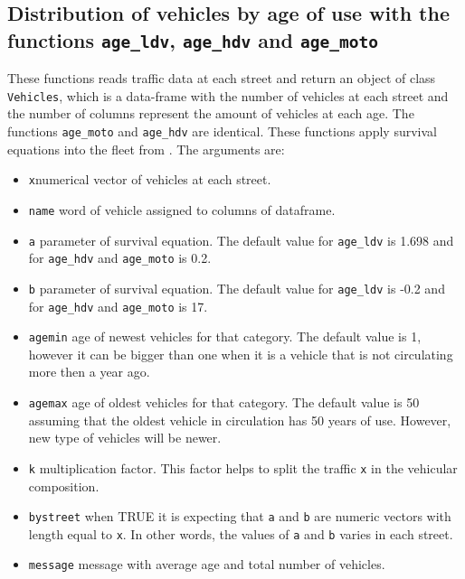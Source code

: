 \documentclass[12pt,graybox,envcountchap,sectrefs]{krantz}
\providecommand{\tightlist}{%
  \setlength{\itemsep}{0pt}\setlength{\parskip}{0pt}}
\theoremstyle{definition}
\theoremstyle{definition}
\theoremstyle{definition}
\theoremstyle{remark}
\begin{document}
\subsection{\texorpdfstring{Distribution of vehicles by age of use with
the functions \texttt{age\_ldv}, \texttt{age\_hdv} and
\texttt{age\_moto}}{Distribution of vehicles by age of use with the functions age\_ldv, age\_hdv and age\_moto}}\label{distribution-of-vehicles-by-age-of-use-with-the-functions-age_ldv-age_hdv-and-age_moto}

These functions reads traffic data at each street and return an object
of class \texttt{Vehicles}, which is a data-frame with the number of
vehicles at each street and the number of columns represent the amount
of vehicles at each age. The functions \texttt{age\_moto} and
\texttt{age\_hdv} are identical. These functions apply survival
equations into the fleet from \citet{MMA2011}. The arguments are:

\begin{itemize}
\tightlist
\item
  \texttt{x}numerical vector of vehicles at each street.
\item
  \texttt{name} word of vehicle assigned to columns of dataframe.
\item
  \texttt{a} parameter of survival equation. The default value for
  \texttt{age\_ldv} is 1.698 and for \texttt{age\_hdv} and
  \texttt{age\_moto} is 0.2.
\item
  \texttt{b} parameter of survival equation. The default value for
  \texttt{age\_ldv} is -0.2 and for \texttt{age\_hdv} and
  \texttt{age\_moto} is 17.
\item
  \texttt{agemin} age of newest vehicles for that category. The default
  value is 1, however it can be bigger than one when it is a vehicle
  that is not circulating more then a year ago.
\item
  \texttt{agemax} age of oldest vehicles for that category. The default
  value is 50 assuming that the oldest vehicle in circulation has 50
  years of use. However, new type of vehicles will be newer.
\item
  \texttt{k} multiplication factor. This factor helps to split the
  traffic \texttt{x} in the vehicular composition.
\item
  \texttt{bystreet} when TRUE it is expecting that \texttt{a} and
  \texttt{b} are numeric vectors with length equal to \texttt{x}. In
  other words, the values of \texttt{a} and \texttt{b} varies in each
  street.
\item
  \texttt{message} message with average age and total number of
  vehicles.
\end{itemize}
\end{document}
